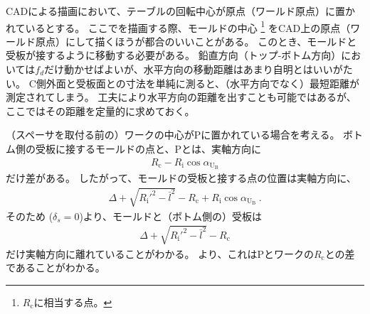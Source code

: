 

CADによる描画において、テーブルの回転中心が原点（ワールド原点）に置かれているとする。
ここでを描画する際、モールドの中心
\footnote{$R_\mathrm c$に相当する点。}\relax
をCAD上の原点（ワールド原点）にして描くほうが都合のいいことがある。
このとき、モールドと受板が接するように移動する必要がある。
鉛直方向（トップ-ボトム方向）においては$f_d$だけ動かせばよいが、水平方向の移動距離はあまり自明とはいいがたい。
C側外面と受板面との寸法を単純に測ると、（水平方向でなく）最短距離が測定されてしまう。
工夫により水平方向の距離を出すことも可能ではあるが、ここではその距離を定量的に求めておく。



（スペーサを取付る前の）ワークの中心が\TableCenter Pに置かれている場合を考える。
ボトム側の受板に接するモールドの点と、\TableCenter Pとは、実軸方向に
\begin{align*}
  R_\mathrm c-R_\mathrm i\cos\alpha_{\mathrm U_\mathrm B}
\end{align*}
だけ差がある。
したがって、モールドの受板と接する点の位置は実軸方向に、
\begin{align*}
  \Delta+\sqrt{R_\mathrm i'^2-\bar l^2}-R_\mathrm c+R_\mathrm i\cos\alpha_{\mathrm U_\mathrm B}\ .
\end{align*}
そのため ($\delta_s = 0$)より、モールドと（ボトム側の）受板は
\begin{align*}
  \Delta+\sqrt{R_\mathrm i'^2-\bar l^2}-R_\mathrm c
\end{align*}
だけ実軸方向に離れていることがわかる。
より、これは\TableCenter Pとワークの\CenterCurvature$R_\mathrm c$との差であることがわかる。



